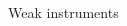 \documentclass[notes,11pt, aspectratio=169]{beamer}
\begin{document}
\begin{frame}{Weak instruments}
\begin{columns}[T]
\begin{column}{0.5\textwidth}
\end{column}
\end{columns}
\end{frame}
\end{document}
